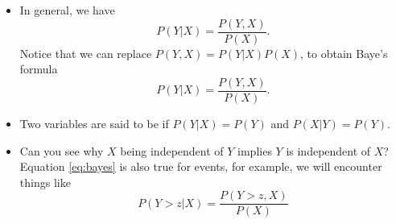 \begin{itemize}
\item In general, we have 
\begin{equation}
P(Y|X) = \frac{P(Y,X)}{P(X)}.
\end{equation}
Notice that we can replace $P(Y,X) = P(Y|X)P(X)$, to obtain Baye's formula 
\begin{equation}\label{eq:bayes}
P(Y|X) = \frac{P(Y,X)}{P(X)}.
\end{equation}
\item Two variables are said to be  if $P(Y|X)  = P(Y)$ and $P(X|Y) = P(Y)$.  
\item Can you see why $X$ being independent of $Y$ implies $Y$ is independent of $X$?
Equation \eqref{eq:bayes} is also true for events, for example, we will encounter things like 
\begin{equation}\label{eq:bayes}
P(Y>z|X) = \frac{P(Y>z,X)}{P(X)}
\end{equation}


\end{itemize}








